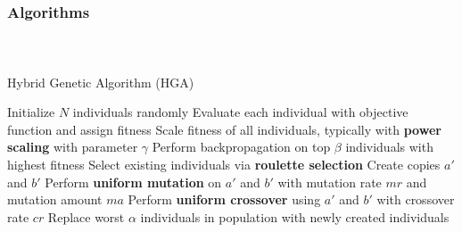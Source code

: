 

\begin{frame}[t]
	\frametitle{Algorithms}
	\framesubtitle{~~}  %

\begin{algorithm}[H]
\small
\caption{Hybrid Genetic Algorithm (HGA)}
\label{alg:hga}
\begin{algorithmic}
\STATE Initialize $N$ individuals randomly
  \STATE Evaluate each individual with objective function and assign fitness
  \STATE Scale fitness of all individuals, typically with \textbf{power scaling} with parameter $\gamma$
  \STATE Perform backpropagation on top $\beta$ individuals with highest fitness
  \STATE Select existing individuals via \textbf{roulette selection}
    \STATE Create copies $a'$ and $b'$
    \STATE Perform \textbf{uniform mutation} on $a'$ and $b'$ with mutation rate $mr$ and mutation amount $ma$
    \STATE Perform \textbf{uniform crossover} using $a'$ and $b'$ with crossover rate $cr$
  \ENDFOR
  \STATE Replace worst $\alpha$ individuals in population with newly created individuals
\ENDFOR
\end{algorithmic}
\end{algorithm}

\end{frame}


